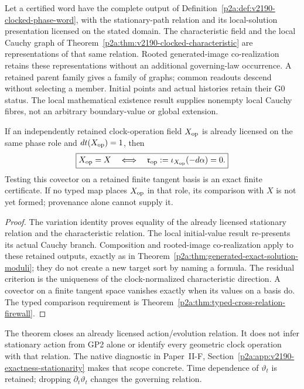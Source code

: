\documentclass[12pt,a4paper]{article}
\begin{document}
\begin{theorem}
\label{p2a:thm:v2190-clock-evolution-closure}
Let a certified word have the complete output of
Definition~\ref{p2a:def:v2190-clocked-phase-word}, with the stationary-path
relation and its local-solution presentation licensed on the stated domain.
The characteristic field and the local Cauchy graph of
Theorem~\ref{p2a:thm:v2190-clocked-characteristic} are representations of
that same relation.  Rooted generated-image co-realization retains these
representations without an additional governing-law occurrence.  A retained
parent family gives a family of graphs; common readouts descend without
selecting a member.  Initial points and actual histories retain their G0
status.  The local mathematical existence result supplies nonempty local
Cauchy fibres, not an arbitrary boundary-value or global extension.

If an independently retained clock-operation field \(X_{\rm op}\) is
already licensed on the same phase role and \(dt(X_{\rm op})=1\), then
\[
 \boxed{X_{\rm op}=X
 \quad\Longleftrightarrow\quad
 \mathfrak r_{\rm op}:=\iota_{X_{\rm op}}(-d\alpha)=0.}
\]
Testing this covector on a retained finite tangent basis is an exact finite
certificate.  If no typed map places \(X_{\rm op}\) in that role, its
comparison with \(X\) is not yet formed; provenance alone cannot supply it.
\end{theorem}
\begin{proof}
The variation identity proves equality of the already licensed stationary
relation and the characteristic relation.  The local initial-value result
re-presents its actual Cauchy branch.  Composition and rooted-image
co-realization apply to these retained outputs, exactly as in
Theorem~\ref{p2a:thm:generated-exact-solution-moduli}; they do not create a
new target sort by naming a formula.  The residual criterion is the
uniqueness of the clock-normalized characteristic direction.  A covector
on a finite tangent space vanishes exactly when its values on a basis do.
The typed comparison requirement is
Theorem~\ref{p2a:thm:typed-cross-relation-firewall}.
\end{proof}

The theorem closes an already licensed action/evolution relation.  It does
not infer stationary action from GP2 alone or identify every geometric
clock operation with that relation.  The native diagnostic in
Paper~II-F, Section~\ref{p2a:app:v2190-exactness-stationarity} makes that scope concrete.
Time dependence of \(\vartheta_t\) is retained; dropping
\(\partial_t\vartheta_t\) changes the governing relation.
\end{document}
